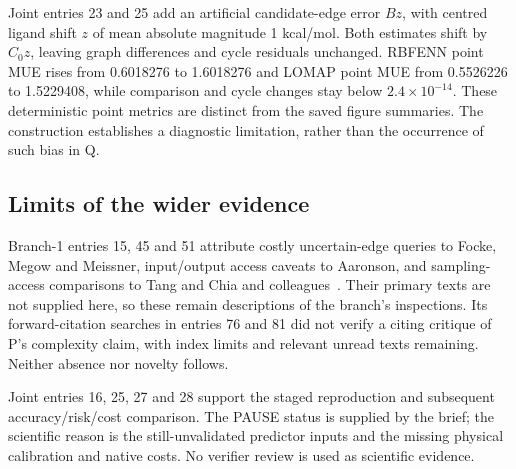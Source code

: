 \documentclass{article}
\begin{document}
Joint entries 23 and 25 add an artificial candidate-edge error \(Bz\), with centred ligand shift \(z\) of mean absolute magnitude 1 kcal/mol. Both estimates shift by \(C_0z\), leaving graph differences and cycle residuals unchanged. RBFENN point MUE rises from 0.6018276 to 1.6018276 and LOMAP point MUE from 0.5526226 to 1.5229408, while comparison and cycle changes stay below \(2.4\times10^{-14}\). These deterministic point metrics are distinct from the saved figure summaries. The construction establishes a diagnostic limitation, rather than the occurrence of such bias in Q.

\subsection{Limits of the wider evidence}

Branch-1 entries 15, 45 and 51 attribute costly uncertain-edge queries to Focke, Megow and Meissner, input/output access caveats to Aaronson, and sampling-access comparisons to Tang and Chia and colleagues~\cite{queries,fineprint,Tang,Chia}. Their primary texts are not supplied here, so these remain descriptions of the branch's inspections. Its forward-citation searches in entries 76 and 81 did not verify a citing critique of P's complexity claim, with index limits and relevant unread texts remaining. Neither absence nor novelty follows.

Joint entries 16, 25, 27 and 28 support the staged reproduction and subsequent accuracy/risk/cost comparison. The PAUSE status is supplied by the brief; the scientific reason is the still-unvalidated predictor inputs and the missing physical calibration and native costs. No verifier review is used as scientific evidence.



\end{document}
